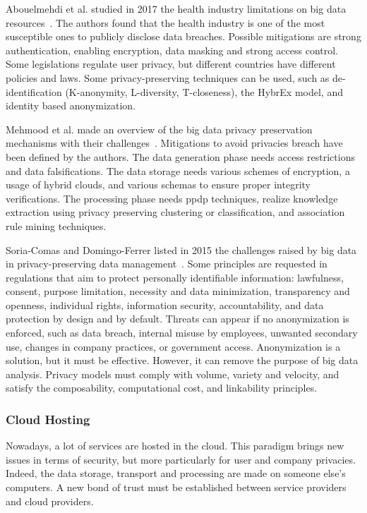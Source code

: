 Abouelmehdi et al. studied in 2017 the health industry limitations on big data resources~\cite{ABOUELMEHDI201773}. The authors found that the health industry is one of the most susceptible ones to publicly disclose data breaches. Possible mitigations are strong authentication, enabling encryption, data masking and strong access control. Some legislations regulate user privacy, but different countries have different policies and laws. Some privacy-preserving techniques can be used, such as de-identification (K-anonymity, L-diversity, T-closeness), the HybrEx model, and identity based anonymization. %

Mehmood et al. made an overview of the big data privacy preservation mechanisms with their challenges~\cite{ieee-7460114}. Mitigations to avoid privacies breach have been defined by the authors. The data generation phase needs access restrictions and data falsifications. The data storage needs various schemes of encryption, a usage of hybrid clouds, and various schemas to ensure proper integrity verifications. The processing phase needs \gls{ppdp} techniques, realize knowledge extraction using privacy preserving clustering or classification, and association rule mining techniques. %

Soria-Comas and Domingo-Ferrer listed in 2015 the challenges raised by big data in privacy-preserving data management~\cite{soria-comas_big_2016}. Some principles are requested in regulations that aim to protect personally identifiable information: lawfulness, consent, purpose limitation, necessity and data minimization, transparency and openness, individual rights, information security, accountability, and data protection by design and by default. Threats can appear if no anonymization is enforced, such as data breach, internal misuse by employees, unwanted secondary use, changes in company practices, or government access. Anonymization is a solution, but it must be effective. However, it can remove the purpose of big data analysis. Privacy models must comply with volume, variety and velocity, and satisfy the composability, computational cost, and linkability principles. %

\subsubsection{Cloud Hosting}
\label{subsubsec:state_review_results_cloud}

Nowadays, a lot of services are hosted in the \gls{cloud}. This paradigm brings new issues in terms of security, but more particularly for user and company privacies. Indeed, the data storage, transport and processing are made on someone else's computers. A new bond of trust must be established between service providers and \gls{cloud} providers.


